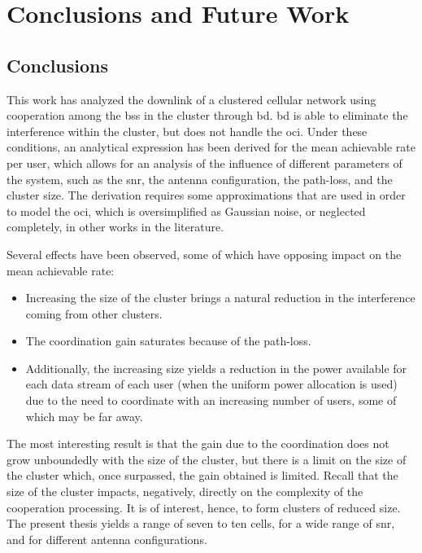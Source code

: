\chapter{Conclusions and Future Work}\label{ch:conclusions_and_future}

\section{Conclusions} \label{sec:conc}

This work has analyzed the downlink of a clustered cellular network using
cooperation among the \glspl{bs} in the cluster through \gls{bd}. \gls{bd} is
able to eliminate the interference within the cluster, but does not handle the
\gls{oci}. Under these conditions, an analytical expression has been derived for
the mean achievable rate per user, which allows for an analysis of the influence
of different parameters of the system, such as the \gls{snr}, the antenna
configuration, the path-loss, and the cluster size. The derivation requires some
approximations that are used in order to model the \gls{oci}, which is
oversimplified as Gaussian noise, or neglected completely, in other works in the
literature.

Several effects have been observed, some of which have opposing impact on the
mean achievable rate:

\begin{itemize}
   \item Increasing the size of the cluster brings a natural reduction in the
      interference coming from other clusters.
   \item The coordination gain saturates because of the path-loss.
   \item Additionally, the increasing size yields a reduction in the power
      available for each data stream of each user (when the uniform power
      allocation is used) due to the need to coordinate with an increasing
      number of users, some of which may be far away.
\end{itemize}

The most interesting result is that the gain due to the coordination does not
grow unboundedly with the size of the cluster, but there is a limit on the size
of the cluster which, once surpassed, the gain obtained is limited. Recall that
the size of the cluster impacts, negatively, directly on the complexity of the
cooperation processing. It is of interest, hence, to form clusters of reduced
size. The present thesis yields a range of seven to ten cells, for a wide range
of \gls{snr}, and for different antenna configurations.

